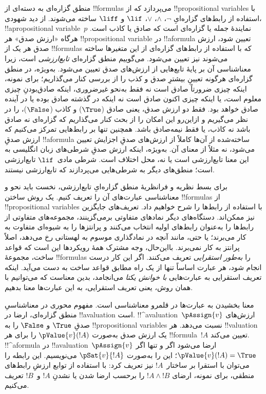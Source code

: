 \documentclass[../../../include/open-logic-section]{subfiles}
\begin{document}


منطق گزاره‌ای به دسته‌ای از !!{formula}s می‌پردازد که از
!!{propositional variable}s با استفاده از رابط‌های گزاره‌ایِ
$\lnot$، $\land$، $\lor$، $\lif$ و $\liff$ ساخته می‌شوند. از دید
شهودی، !!a{propositional variable}~$p$ نمایندهٔ جمله یا گزاره‌ای است که
صادق یا کاذب است. هرگاه «ارزش صدق» هر !!{propositional variable} در
!!a{formula} تعیین شود، ارزش صدق هر یک از !!{formula}s که با استفاده از
رابط‌های گزاره‌ای از این متغیرها ساخته می‌شوند نیز تعیین می‌شود. می‌گوییم
منطق گزاره‌ای \emph{تابع‌ارزشی} است، زیرا معناشناسی آن بر پایهٔ تابع‌هایی
از ارزش‌های صدق تعیین می‌شود. به‌ویژه، در منطق گزاره‌ای هرگونه تعیینِ بیشترِ
صدق و کذب را از بررسی کنار می‌گذاریم؛ برای نمونه، اینکه چیزی ضرورتاً صادق
است نه فقط به‌نحو غیرضروری، اینکه صادق‌بودنِ چیزی معلوم است، یا اینکه
چیزی اکنون صادق است نه اینکه در گذشته صادق بوده یا در آینده صادق خواهد
بود. فقط دو ارزش صدق، یعنی صادق ($\True$) و کاذب ($\False$)، را در نظر
می‌گیریم و ازاین‌رو این امکان را از بحث کنار می‌گذاریم که گزاره‌ای نه صادق
باشد نه کاذب، یا فقط نیمه‌صادق باشد. همچنین تنها بر رابط‌هایی تمرکز می‌کنیم
که ارزش صدقِ !!a{formula} ساخته‌شده از آن‌ها کاملاً از ارزش‌های صدقِ
اجزایش تعیین می‌شود، نه مثلاً از معنای آن. به‌ویژه، اینکه ارزش صدقِ
شرطی‌های زبان انگلیسی به این معنا تابع‌ارزشی است یا نه، محل اختلاف است.
شرطی مادی~$\lif$ تابع‌ارزشی است؛ منطق‌های دیگر به شرطی‌هایی می‌پردازند که
تابع‌ارزشی نیستند.

برای بسط نظریه و فرانظریهٔ منطق گزاره‌ایِ تابع‌ارزشی، نخست باید نحو و
معناشناسی عبارت‌های آن را تعریف کنیم. یک روش ساختن !!{formula}s از
!!{propositional variable}s با استفاده از رابط‌ها را شرح خواهیم داد.
تعریف‌های جایگزین نیز ممکن‌اند. دستگاه‌های دیگر نمادهای متفاوتی برمی‌گزینند،
مجموعه‌های متفاوتی از رابط‌ها را به‌عنوان رابط‌های اولیه انتخاب می‌کنند و
پرانتزها را به شیوه‌ای متفاوت به کار می‌برند؛ یا حتی، مانند آنچه در
نمادگذاری موسوم به لهستانی رخ می‌دهد، اصلاً پرانتز به کار نمی‌برند. بااین‌حال،
وجه مشترک همهٔ رویکردها این است که قواعد ساخت، مجموعهٔ !!{formula}s را
\emph{به‌طور استقرایی} تعریف می‌کنند. اگر این کار درست انجام شود، هر عبارت
اساساً تنها از یک راه مطابق قواعد ساخت به دست می‌آید. اینکه تعریف استقرایی
به عبارت‌هایی \emph{با خوانش یکتا} می‌انجامد، بدین معناست که می‌توانیم با
همان روش، یعنی تعریف استقرایی، به این عبارت‌ها معنا بدهیم.

معنا بخشیدن به عبارت‌ها در قلمرو معناشناسی است. مفهوم محوری در معناشناسیِ
منطق گزاره‌ای، ارضا در !!a{valuation} است. !!^a{valuation}~$\pAssign{v}$
ارزش‌های صدقِ $\True$ و $\False$ را به !!{propositional variable}s نسبت
می‌دهد. هر !!{valuation} یک ارزش صدق به‌صورت $\pValue{v}(!A)$ را برای هر
!!{formula}~$!A$ تعیین می‌کند. !!^a{formula} در
!!a{valuation}~$\pAssign{v}$ ارضا می‌شود اگر و تنها اگر
$\pValue{v}(!A) = \True$؛ این را به‌صورت $\pSat{v}{!A}$ می‌نویسیم. این
رابطه را می‌توان با استقرا بر ساختار~$!A$ نیز تعریف کرد: با استفاده از
توابع ارزشِ رابط‌های منطقی، برای نمونه، ارضای $!A \land !B$ را برحسب ارضا
شدن یا نشدنِ $!A$ و~$!B$ تعریف می‌کنیم.
\end{document}
